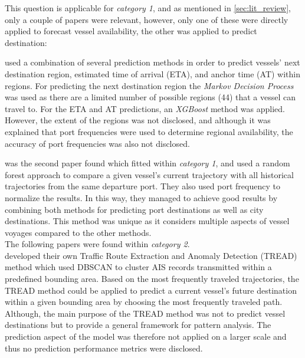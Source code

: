 
This question is applicable for \textit{category 1}, and as mentioned in \cref{sec:lit_review}, only a couple of papers were relevant, however, only one of these were directly applied to forecast vessel availability, the other was applied to predict destination:

\cite{lechtenberg2019} used a combination of several prediction methods in order to predict vessels’ next destination region, estimated time of arrival (ETA), and anchor time (AT) within regions. For predicting the next destination region the \textit{Markov Decision Process} was used as there are a limited number of possible regions (44) that a vessel can travel to. For the ETA and AT predictions, an \textit{XGBoost} method was applied. However, the extent of the regions was not disclosed, and although it was explained that port frequencies were used to determine regional availability, the accuracy of port frequencies was also not disclosed.


\cite{Zhang2020AISApproach} was the second paper found which fitted within \textit{category 1}, and used a random forest approach to compare a given vessel’s current trajectory with all historical trajectories from the same departure port. They also used port frequency to normalize the results. In this way, they managed to achieve good results by combining both methods for predicting port destinations as well as city destinations. This method was unique as it considers multiple aspects of vessel voyages compared to the other methods.\\

The following papers were found within \textit{category 2}.\\

\cite{pallotta} developed their own Traffic Route Extraction and Anomaly Detection (TREAD) method which used DBSCAN to cluster AIS records transmitted within a predefined bounding area. Based on the most frequently traveled trajectories, the TREAD method could be applied to predict a current vessel’s future destination within a given bounding area by choosing the most frequently traveled path. Although, the main purpose of the TREAD method was not to predict vessel destinations but to provide a general framework for pattern analysis. The prediction aspect of the model was therefore not applied on a larger scale and thus no prediction performance metrics were disclosed.

